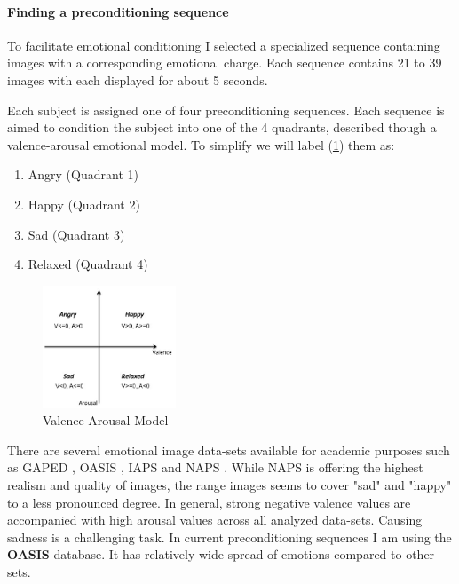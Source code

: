 \paragraph{Finding a preconditioning sequence}
To facilitate emotional conditioning I selected a specialized sequence containing images with a corresponding emotional charge.
Each sequence contains 21 to 39  images with each displayed for about 5 seconds.

Each subject is assigned one of four preconditioning sequences. Each sequence is aimed to condition the subject into one of the 4 quadrants, described though a valence-arousal emotional model. To simplify we will label (\ref{fig:valence_arousal_model}) them as:
\begin{enumerate}
	\item Angry (Quadrant 1)
	\item Happy (Quadrant 2)
	\item Sad (Quadrant 3)
	\item Relaxed (Quadrant 4)
\end{enumerate}


\begin{figure}
\begin{center}
	\includegraphics[width=150px]{graphics/Valence-Arousal-model-showing-the-quadrants-of-the-four-emotion-tags-used-in-this_W640.jpg}
	\caption{Valence Arousal Model \cite{Song2013} \label{fig:valence_arousal_model}}
	
\end{center}
\end{figure}

There are several emotional image data-sets available for academic purposes such as GAPED \cite{Dan-Glauser2011}, OASIS \cite{Kurdi2017}, IAPS \cite{Lang1997} and NAPS \cite{Marchewka2014}. While NAPS is offering the highest realism and quality of images, the range images seems to cover "sad" and "happy" to a less pronounced degree. In general, strong negative valence values are accompanied with high arousal values across all analyzed data-sets. Causing sadness is a challenging task. In current preconditioning sequences I am using the \textbf{OASIS} database. It has relatively wide spread of emotions compared to other sets.

